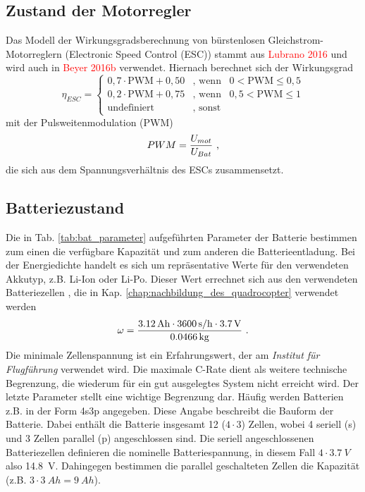 \subsection{Zustand der Motorregler}
\label{subsec:motorreglerzustand}
Das Modell der Wirkungsgradsberechnung von bürstenlosen Gleichstrom-Motorreglern (Electronic Speed Control (ESC)) stammt aus \textcolor{red}{Lubrano 2016} und wird auch in \textcolor{red}{Beyer 2016b} verwendet. Hiernach berechnet sich der Wirkungsgrad 
\begin{equation}
\eta_{ESC} = \begin{cases} 
0,7\cdot \text{PWM} + 0,50 & \text{, wenn} \;\;\; 0 < \text{PWM} \leq 0,5 \\ 
0,2\cdot \text{PWM} + 0,75 & \text{, wenn} \;\;\; 0,5 < \text{PWM} \leq 1 \\ 
\text{undefiniert} & \text{, sonst} 
\end{cases}
\label{eq:eta_pwm}
\end{equation} 
mit der Pulsweitenmodulation (PWM) 
\begin{equation}
	PWM = \frac{U_{mot}}{U_{Bat}} ~\text{,}
	\label{eq:pwm}
\end{equation}
die sich aus dem Spannungsverhältnis des ESCs zusammensetzt.


\subsection{Batteriezustand}
\label{subsec:batteriezustand}

Die in Tab. \ref{tab:bat_parameter} aufgeführten Parameter der Batterie bestimmen zum einen die verfügbare Kapazität und zum anderen die Batterieentladung. Bei der Energiedichte handelt es sich um repräsentative Werte für den verwendeten Akkutyp, z.B. Li-Ion oder Li-Po. Dieser Wert errechnet sich aus den verwendeten Batteriezellen \cite{batteriezelle}, die in Kap. \ref{chap:nachbildung_des_quadrocopter} verwendet werden
\begin{equation}
	\omega = \frac{\SI{3.12}{Ah}\cdot \SI{3600}{s/h}\cdot \SI{3,7}{V}}{\SI{0.0466}{kg}} ~\text{.}
\end{equation}
Die minimale Zellenspannung ist ein Erfahrungswert, der am \textit{Institut für Flugführung} verwendet wird. Die maximale C-Rate dient als weitere technische Begrenzung, die wiederum für ein gut ausgelegtes System nicht erreicht wird. Der letzte Parameter stellt eine wichtige Begrenzung dar.
Häufig werden Batterien z.B. in der Form 4s3p angegeben. Diese Angabe beschreibt die Bauform der Batterie. Dabei enthält die Batterie insgesamt 12 (\ensuremath{4\cdot 3}) Zellen, wobei 4 seriell (s) und 3 Zellen parallel (p) angeschlossen sind. Die seriell angeschlossenen Batteriezellen definieren die nominelle Batteriespannung, in diesem Fall \ensuremath{4\cdot \SI{3,7}{V}} also \SI{14,8}{V}. Dahingegen bestimmen die parallel geschalteten Zellen die Kapazität (z.B. \ensuremath{3\cdot \SI{3}{Ah} = \SI{9}{Ah}}).

